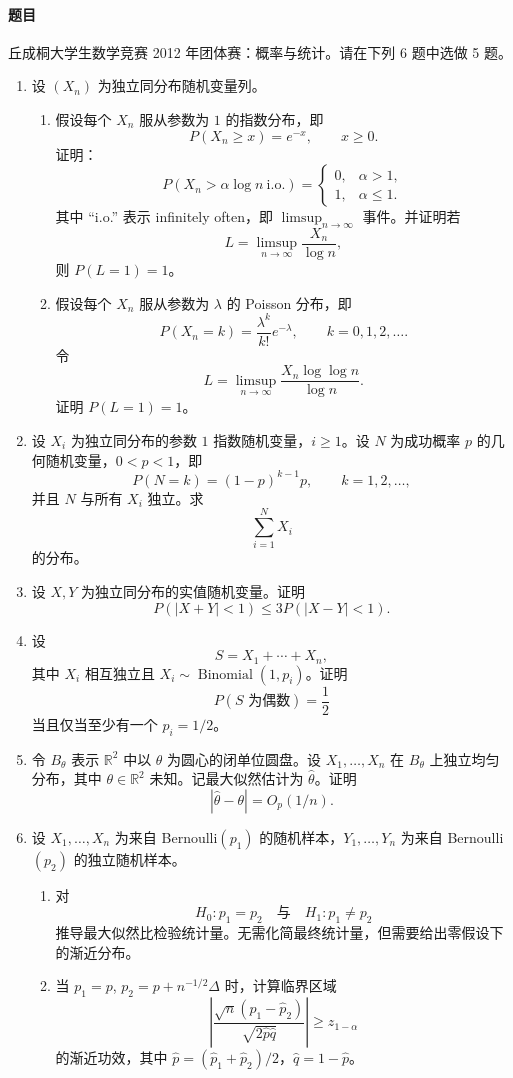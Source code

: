\documentclass[UTF8,12pt]{ctexart}
\begin{document}
\paragraph{题目}
丘成桐大学生数学竞赛 2012 年团体赛：概率与统计。请在下列 6 题中选做 5 题。
\begin{enumerate}[label=\textbf{\arabic*.},leftmargin=2.2em]
\item 设 \((X_n)\) 为独立同分布随机变量列。
\begin{enumerate}[label=\textbf{(\arabic*)},leftmargin=2.4em]
\item 假设每个 \(X_n\) 服从参数为 \(1\) 的指数分布，即
\[
P(X_n\ge x)=e^{-x},\qquad x\ge0.
\]
证明：
\[
P(X_n>\alpha\log n\ \text{i.o.})=
\begin{cases}
0,&\alpha>1,\\
1,&\alpha\le1.
\end{cases}
\]
其中 “i.o.” 表示 infinitely often，即 \(\limsup_{n\to\infty}\) 事件。并证明若
\[
L=\limsup_{n\to\infty}\frac{X_n}{\log n},
\]
则 \(P(L=1)=1\)。
\item 假设每个 \(X_n\) 服从参数为 \(\lambda\) 的 Poisson 分布，即
\[
P(X_n=k)=\frac{\lambda^k}{k!}e^{-\lambda},\qquad k=0,1,2,\ldots.
\]
令
\[
L=\limsup_{n\to\infty}\frac{X_n\log\log n}{\log n}.
\]
证明 \(P(L=1)=1\)。
\end{enumerate}

\item 设 \(X_i\) 为独立同分布的参数 \(1\) 指数随机变量，\(i\ge1\)。设 \(N\) 为成功概率 \(p\) 的几何随机变量，\(0<p<1\)，即
\[
P(N=k)=(1-p)^{k-1}p,\qquad k=1,2,\ldots,
\]
并且 \(N\) 与所有 \(X_i\) 独立。求
\[
\sum_{i=1}^{N}X_i
\]
的分布。

\item 设 \(X,Y\) 为独立同分布的实值随机变量。证明
\[
P(|X+Y|<1)\le 3P(|X-Y|<1).
\]

\item 设
\[
S=X_1+\cdots+X_n,
\]
其中 \(X_i\) 相互独立且 \(X_i\sim\operatorname{Binomial}(1,p_i)\)。证明
\[
P(S\text{ 为偶数})=\frac12
\]
当且仅当至少有一个 \(p_i=1/2\)。

\item 令 \(B_\theta\) 表示 \(\mathbb R^2\) 中以 \(\theta\) 为圆心的闭单位圆盘。设 \(X_1,\ldots,X_n\) 在 \(B_\theta\) 上独立均匀分布，其中 \(\theta\in\mathbb R^2\) 未知。记最大似然估计为 \(\widehat\theta\)。证明
\[
|\widehat\theta-\theta|=O_p(1/n).
\]

\item 设 \(X_1,\ldots,X_n\) 为来自 Bernoulli\((p_1)\) 的随机样本，\(Y_1,\ldots,Y_n\) 为来自 Bernoulli\((p_2)\) 的独立随机样本。
\begin{enumerate}[label=\textbf{(\alph*)},leftmargin=2.4em]
\item 对
\[
H_0:p_1=p_2\quad\text{与}\quad H_1:p_1\ne p_2
\]
推导最大似然比检验统计量。无需化简最终统计量，但需要给出零假设下的渐近分布。
\item 当 \(p_1=p\), \(p_2=p+n^{-1/2}\Delta\) 时，计算临界区域
\[
\left|\frac{\sqrt n(\widehat p_1-\widehat p_2)}{\sqrt{2\widehat p\widehat q}}\right|\ge z_{1-\alpha}
\]
的渐近功效，其中 \(\widehat p=(\widehat p_1+\widehat p_2)/2\)，\(\widehat q=1-\widehat p\)。
\end{enumerate}
\end{enumerate}
\end{document}

